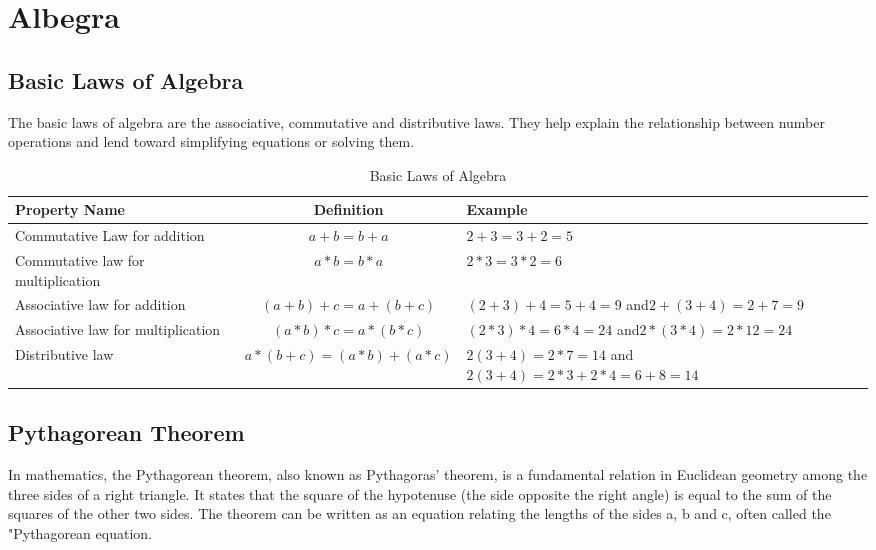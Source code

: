 

\chapter{Albegra}
\section{Basic Laws of Algebra}
The basic laws of algebra are the associative, commutative and distributive laws. They help explain the relationship between number operations and lend toward simplifying equations or solving them.
\begin{table}[h]
	\centering
	\begin{tabular}{|m{4cm}|c|m{6cm}|}
		\hline
		Property Name & Definition & Example \\ \hline
		Commutative Law for addition & $a+b = b+ a$ & $2+3 = 3+2 = 5$ \\ \hline
		Commutative law for multiplication & $a * b = b * a$ & $2 * 3 = 3 * 2 = 6$ \\ \hline
		Associative law for addition & $(a+b) + c = a + (b+c)$ & $(2+3) + 4 = 5 + 4 = 9$ and\newline $2 + (3+4) = 2 + 7 = 9$ \\ \hline
		Associative law for multiplication & $(a*b)*c = a* (b*c)$ & $(2*3) *4 = 6*4 = 24$ and\newline$2*(3*4) = 2*12=24$ \\ \hline
		Distributive law & $a*(b+c) = (a*b) + (a*c)$ & $2(3+4) = 2*7=14$ and\newline  $2(3+4) = 2*3 + 2*4 = 6+8 = 14$ \\
		\hline
	\end{tabular}
	\caption{Basic Laws of Algebra}
\end{table}
\newpage
\section{Pythagorean Theorem}

	In mathematics, the Pythagorean theorem, also known as Pythagoras' theorem, is a fundamental relation in Euclidean geometry among the three sides of a right triangle. It states that the square of the hypotenuse (the side opposite the right angle) is equal to the sum of the squares of the other two sides. The theorem can be written as an equation relating the lengths of the sides a, b and c, often called the "Pythagorean equation.

